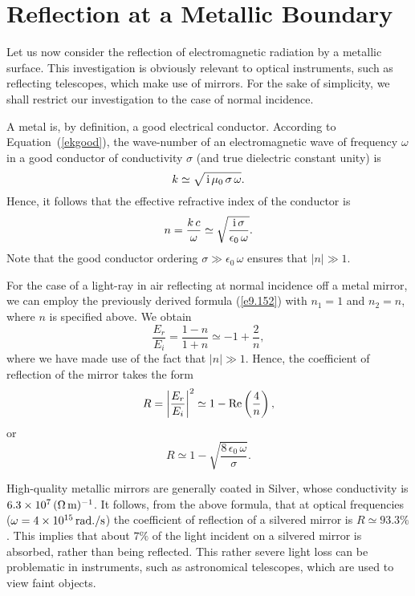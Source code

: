 \section{Reflection at a Metallic Boundary}
Let us now consider the reflection of electromagnetic radiation by
a metallic surface. This investigation is obviously relevant to
optical instruments, such as reflecting telescopes, which make use of
mirrors. For the sake of simplicity, we shall restrict our investigation
to the case of normal incidence. 

A metal is, by definition, a good electrical conductor. According to Equation~(\ref{ekgood}), the wave-number of an electromagnetic wave of frequency $\omega$ in a good conductor of
conductivity $\sigma$ (and true dielectric constant unity) is 
\begin{equation}
k\simeq \sqrt{\,{\rm i}\,\mu_0\,\sigma\,\omega}.
\end{equation}
Hence, it follows that the effective refractive index of the conductor is
\begin{equation}
n = \frac{k\,c}{\omega}\simeq \sqrt{\frac{{\rm i}\,\sigma}{\epsilon_0\,\omega}}.
\end{equation}
Note that the good conductor ordering $\sigma\gg \epsilon_0\,\omega$
ensures that $|n|\gg 1$.

For the case of a light-ray in air reflecting at normal incidence off a metal mirror, we can employ the previously derived formula (\ref{e9.152})
with $n_1=1$ and $n_2=n$, where $n$ is specified above. We obtain
\begin{equation}
\frac{E_r}{E_i} = \frac{1-n}{1+n} \simeq -1 + \frac{2}{n},
\end{equation}
where we have made use of the fact that $|n|\gg 1$. Hence, the coefficient
of reflection of the mirror takes the form
\begin{equation}
R = \left|\frac{E_r}{E_i}\right|^2\simeq 1 - {\rm Re}\left(\frac{4}{n}\right),
\end{equation}
or
\begin{equation}
R \simeq 1 - \sqrt{\frac{8\,\epsilon_0\,\omega}{\sigma}}.
\end{equation}

High-quality metallic mirrors are generally coated in Silver, whose conductivity
is $6.3\times 10^7\,(\Omega\,{\rm m})^{-1}$. It follows, from the above
formula, that  at optical
frequencies ($\omega = 4\times 10^{15}\,{\rm rad./s}$) the coefficient
of reflection of a silvered mirror is $R\simeq 93.3\%$. This implies that
about $7\%$ of the light incident on a silvered mirror is absorbed, rather than being reflected. This rather severe light loss can be
problematic in instruments, such as astronomical telescopes, which are used to
view faint objects. 

